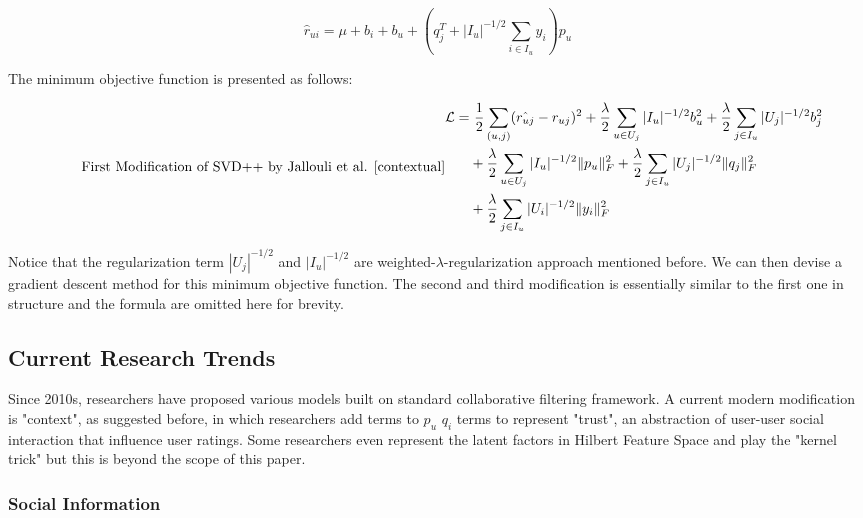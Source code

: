 \documentclass[letter paper, 11pt]{article}
\begin{document}
	\begin{equation}
		\hat{r}_{ui} = \mu + b_i + b_u  + (q_j^T + |I_u|^{-1/2}\sum_{i \in I_u} y_i) p_u
	\end{equation}
	
	The minimum objective function is presented as follows:
	
	\begin{equation}
		\tag*{First Modification of SVD++ by Jallouli et al. \cite{contextual}}
		\begin{split}
			\mathcal{L} = &\ \dfrac{1}{2} \sum_{(u, j)} (\hat{r_{uj}} - r_{uj})^2 + \dfrac{\lambda}{2} \sum_{u \in U_j} |I_u|^{-1/2} b_u^2 + \dfrac{\lambda}{2} \sum_{j \in I_u} |U_j|^{-1/2} b_j^2 \\
			& + \dfrac{\lambda}{2} \sum_{u \in U_j} |I_u|^{-1/2} \|p_u\|_F^{2} + \dfrac{\lambda}{2} \sum_{j \in I_u} |U_j|^{-1/2} \|q_j\|_F^{2} \\
			& + \dfrac{\lambda}{2} \sum_{j \in I_u} |U_i|^{-1/2} \|y_i\|_F^{2}
		\end{split}
	\end{equation}
	
	Notice that the regularization term $|U_j|^{-1/2}$ and $|I_u|^{-1/2}$ are weighted-$\lambda$-regularization approach mentioned before. We can then devise a gradient descent method for this minimum objective function. The second and third modification is essentially similar to the first one in structure and the formula are omitted here for brevity.
	
	
	\subsection{Current Research Trends}
	Since 2010s, researchers have proposed various models built on standard collaborative filtering framework. A current modern modification is "context", as suggested before, in which researchers add terms to $p_u$ $q_i$ terms to represent "trust", an abstraction of user-user social interaction that influence user ratings. Some researchers even represent the latent factors in Hilbert Feature Space and play the "kernel trick" \cite{Kernel-MF} but this is beyond the scope of this paper.
	
	\subsubsection{Social Information}
	
\end{document}
